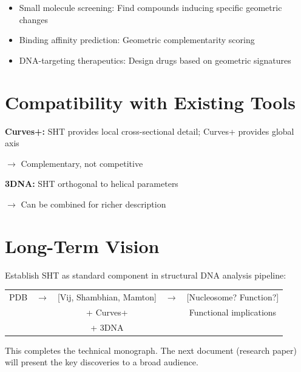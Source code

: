 \begin{itemize}
    \item Small molecule screening: Find compounds inducing specific geometric changes
    \item Binding affinity prediction: Geometric complementarity scoring
    \item DNA-targeting therapeutics: Design drugs based on geometric signatures
\end{itemize}

\section{Compatibility with Existing Tools}

\textbf{Curves+:} SHT provides local cross-sectional detail; Curves+ provides global axis

$\rightarrow$ Complementary, not competitive

\textbf{3DNA:} SHT orthogonal to helical parameters

$\rightarrow$ Can be combined for richer description

\section{Long-Term Vision}

Establish SHT as standard component in structural DNA analysis pipeline:

\begin{center}
    \begin{tabular}{c c c c c}
        PDB & $\rightarrow$ & [Vij, Shambhian, Mamton] & $\rightarrow$ & [Nucleosome? Function?] \\
        & & + Curves+ & & Functional implications \\
        & & + 3DNA & & 
    \end{tabular}
\end{center}

This completes the technical monograph. The next document (research paper) will present the key discoveries to a broad audience.
